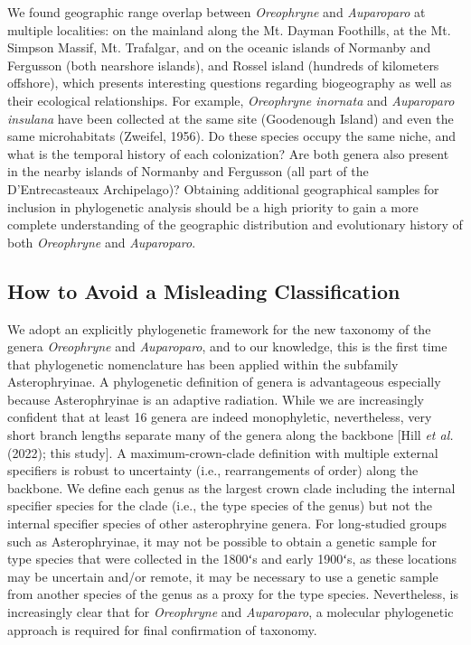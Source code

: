 \documentclass[
  letterpaper,
  DIV=11,
  numbers=noendperiod]{scrartcl}
\begin{document}
We found geographic range overlap between \emph{Oreophryne} and
\emph{Auparoparo} at multiple localities: on the mainland along the Mt.
Dayman Foothills, at the Mt. Simpson Massif, Mt. Trafalgar, and on the
oceanic islands of Normanby and Fergusson (both nearshore islands), and
Rossel island (hundreds of kilometers offshore), which presents
interesting questions regarding biogeography as well as their ecological
relationships. For example, \emph{Oreophryne inornata} and
\emph{Auparoparo insulana} have been collected at the same site
(Goodenough Island) and even the same microhabitats (Zweifel, 1956). Do
these species occupy the same niche, and what is the temporal history of
each colonization? Are both genera also present in the nearby islands of
Normanby and Fergusson (all part of the D'Entrecasteaux Archipelago)?
Obtaining additional geographical samples for inclusion in phylogenetic
analysis should be a high priority to gain a more complete understanding
of the geographic distribution and evolutionary history of both
\emph{Oreophryne} and \emph{Auparoparo}.

\subsection{How to Avoid a Misleading
Classification}\label{how-to-avoid-a-misleading-classification}

We adopt an explicitly phylogenetic framework for the new taxonomy of
the genera \emph{Oreophryne} and \emph{Auparoparo}, and to our
knowledge, this is the first time that phylogenetic nomenclature has
been applied within the subfamily Asterophryinae. A phylogenetic
definition of genera is advantageous especially because Asterophryinae
is an adaptive radiation. While we are increasingly confident that at
least 16 genera are indeed monophyletic, nevertheless, very short branch
lengths separate many of the genera along the backbone {[}Hill \emph{et
al.} (2022); this study{]}. A maximum-crown-clade definition with
multiple external specifiers is robust to uncertainty (i.e.,
rearrangements of order) along the backbone. We define each genus as the
largest crown clade including the internal specifier species for the
clade (i.e., the type species of the genus) but not the internal
specifier species of other asterophryine genera. For long-studied groups
such as Asterophryinae, it may not be possible to obtain a genetic
sample for type species that were collected in the 1800ʻs and early
1900ʻs, as these locations may be uncertain and/or remote, it may be
necessary to use a genetic sample from another species of the genus as a
proxy for the type species. Nevertheless, is increasingly clear that for
\emph{Oreophryne} and \emph{Auparoparo}, a molecular phylogenetic
approach is required for final confirmation of taxonomy.
\end{document}
